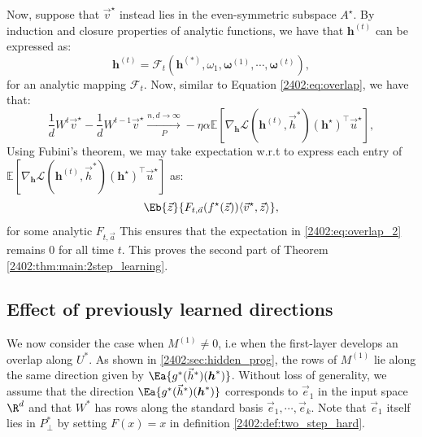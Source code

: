 Now, suppose that $\vec{v}^\star$ instead lies in the even-symmetric subspace $A^\star$. By induction and closure properties of analytic functions, we have that $\boldsymbol{h}^{(t)}$ can be expressed as:
\begin{equation}
   \boldsymbol{h}^{(t)} =  \mathcal{F}_t(\boldsymbol{h}^{(*)} , \omega_1,\boldsymbol{\omega}^{(1)},\cdots,\boldsymbol{\omega}^{(t)}),
\end{equation}
for an analytic mapping $\mathcal{F}_t$.
Now, similar to  Equation \eqref{2402:eq:overlap}, we have that:
\begin{equation}
  \frac{1}{d} W^{t}\vec{v}^\star  -  \frac{1}{d} W^{t-1}\vec{v}^\star \xrightarrow[P]{n,d \rightarrow \infty}- \eta \alpha \mathbb{E}\left[ \nabla_{\boldsymbol{h}} \mathcal{L}(\boldsymbol{h}^{(t)},\vec{h}^*) \left( \boldsymbol{h}^\star \right)^\top\vec{u}^\star\right],
\end{equation}
Using Fubini's theorem, we may take expectation w.r.t to express each entry of $\mathbb{E}\left[ \nabla_{\boldsymbol{h}} \mathcal{L}(\boldsymbol{h}^{(t)},\vec{h}^*) \left( \boldsymbol{h}^\star \right)^\top\vec{u}^\star\right]$ as:
\begin{equation}
     \Eb{\vec{z}}{F_{t,\vec{a}}(f^\star(\vec{z}))\langle \vec{v}^\star, \vec{z}\rangle} ,
\end{equation}
for some analytic $F_{t,\vec{a}}$
This ensures that the expectation in \eqref{2402:eq:overlap_2} remains $0$ for all time $t$. This proves the second part of Theorem \ref{2402:thm:main:2step_learning}.

\subsection{Effect of previously learned directions}\label{2402:sec:app:staircase}

We now consider the case when $M^{(1)} \neq 0$, i.e when the first-layer develops an overlap along $U^*$. As shown in \ref{2402:sec:hidden_prog}, the rows of $M^{(1)}$ lie along the same direction given by $\Ea{g^*(\vec{h}^*)(\boldsymbol{h}^*)}$. Without loss of generality, we assume that the direction $\Ea{g^*(\vec{h}^*)(\boldsymbol{h}^*)}$ corresponds to $\vec{e}_1$ in the input space $\R^d$ and that $W^*$ has rows along the standard basis $\vec{e}_1, \cdots, \vec{e}_k$. Note that $\vec{e}_1$ itself lies in $P^*_\perp$ by setting $F(x)=x$ in definition \ref{2402:def:two_step_hard}.

